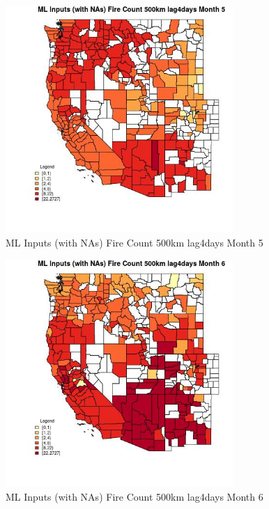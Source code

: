 \begin{figure} 
\centering  
\includegraphics[width=0.77\textwidth]{Code_Outputs/Report_ML_input_PM25_Step4_part_f_de_duplicated_aves_prioritize_24hr_obswNAs_CountyFire_Count_500km_lag4daysmedianMonth5.jpg} 
\caption{\label{fig:Report_ML_input_PM25_Step4_part_f_de_duplicated_aves_prioritize_24hr_obswNAsCountyFire_Count_500km_lag4daysmedianMonth5}ML Inputs (with NAs) Fire Count 500km lag4days Month 5} 
\end{figure} 
 

\begin{figure} 
\centering  
\includegraphics[width=0.77\textwidth]{Code_Outputs/Report_ML_input_PM25_Step4_part_f_de_duplicated_aves_prioritize_24hr_obswNAs_CountyFire_Count_500km_lag4daysmedianMonth6.jpg} 
\caption{\label{fig:Report_ML_input_PM25_Step4_part_f_de_duplicated_aves_prioritize_24hr_obswNAsCountyFire_Count_500km_lag4daysmedianMonth6}ML Inputs (with NAs) Fire Count 500km lag4days Month 6} 
\end{figure} 
 

